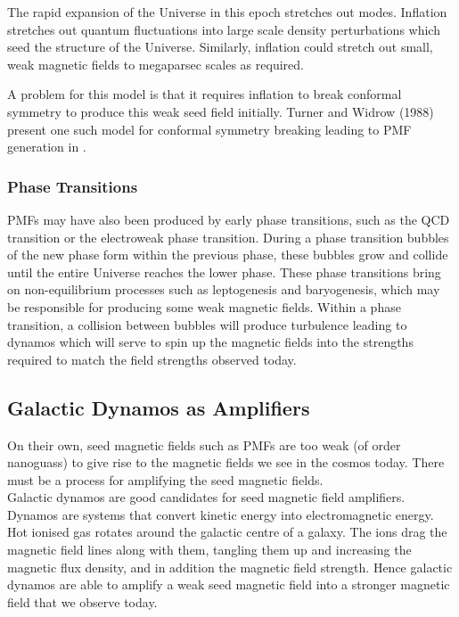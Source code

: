 The rapid expansion of the Universe in this epoch stretches out modes. Inflation stretches out quantum fluctuations into large scale density perturbations which seed the structure of the Universe. Similarly, inflation could stretch out small, weak magnetic fields to megaparsec scales as required.

A problem for this model is that it requires inflation to break conformal symmetry to produce this weak seed field initially. Turner and Widrow (1988) \cite{PhysRevD.37.2743} present one such model for conformal symmetry breaking leading to PMF generation in .
\\
\subsubsection{Phase Transitions}
PMFs may have also been produced by early phase transitions, such as the QCD transition or the electroweak phase transition. During a phase transition bubbles of the new phase form within the previous phase, these bubbles grow and collide until the entire Universe reaches the lower phase. These phase transitions bring on non-equilibrium processes such as leptogenesis and baryogenesis, which may be responsible for producing some weak magnetic fields. Within a phase transition, a collision between bubbles will produce turbulence leading to dynamos which will serve to spin up the magnetic fields into the strengths required to match the field strengths observed today.

\subsection{Galactic Dynamos as Amplifiers}
On their own, seed magnetic fields such as PMFs are too weak (of order nanoguass) to give rise to the magnetic fields we see in the cosmos today. There must be a process for amplifying the seed magnetic fields. \\Galactic dynamos are good candidates for seed magnetic field amplifiers. Dynamos are systems that convert kinetic energy into electromagnetic energy. Hot ionised gas rotates around the galactic centre of a galaxy. The ions drag the magnetic field lines along with them, tangling them up and increasing the magnetic flux density, and in addition the magnetic field strength. Hence galactic dynamos are able to amplify a weak seed magnetic field into a stronger magnetic field that we observe today.

